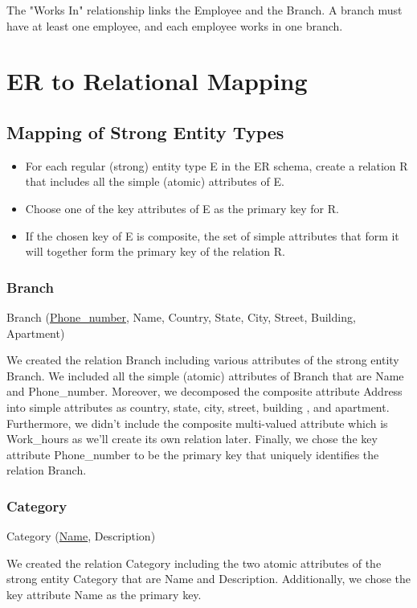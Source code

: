 \documentclass[11pt]{article}
\begin{document}
The "Works In" relationship links the Employee and the Branch. A branch must have at least one employee, and each employee works in one branch.

\section{ER to Relational Mapping}

\subsection{Mapping of Strong Entity Types}

\begin{itemize}
  \item For each regular (strong) entity type E in the ER schema, create a relation R that includes all the simple (atomic) attributes of E.
  \item Choose one of the key attributes of E as the primary key for R.
  \item If the chosen key of E is composite, the set of simple attributes that form it will together form the primary key of the relation R. \cite{slides}
\end{itemize}

\subsubsection{Branch}

Branch (\underline{Phone\_number}, Name, Country, State, City, Street, Building, Apartment)

We created the relation Branch including various attributes of the strong entity Branch. We included all the simple (atomic) attributes of Branch that are Name and Phone\_number. Moreover, we decomposed the composite attribute Address into simple attributes as country, state, city, street, building , and apartment. Furthermore, we didn't include the composite multi-valued attribute which is Work\_hours as we'll create its own relation later. Finally, we chose the key attribute Phone\_number to be the primary key that uniquely identifies the relation Branch.

\subsubsection{Category}

Category (\underline{Name}, Description)

We created the relation Category including the two atomic attributes of the strong entity Category that are Name and Description. Additionally, we chose the key attribute Name as the primary key.
\end{document}
